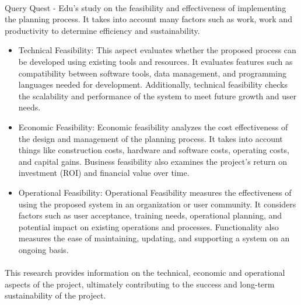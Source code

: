 \paragraph{}Query Quest - Edu's study on the feasibility and effectiveness of implementing the planning process. It takes into account many factors such as work, work and productivity to determine efficiency and sustainability.

\begin{itemize}
    

\item Technical Feasibility: This aspect evaluates whether the proposed process can be developed using existing tools and resources. It evaluates features such as compatibility between software tools, data management, and programming languages needed for development. Additionally, technical feasibility checks the scalability and performance of the system to meet future growth and user needs.

\item Economic Feasibility: Economic feasibility analyzes the cost effectiveness of the design and management of the planning process. It takes into account things like construction costs, hardware and software costs, operating costs, and capital gains. Business feasibility also examines the project's return on investment (ROI) and financial value over time.

\item Operational Feasibility: Operational Feasibility measures the effectiveness of using the proposed system in an organization or user community. It considers factors such as user acceptance, training needs, operational planning, and potential impact on existing operations and processes. Functionality also measures the ease of maintaining, updating, and supporting a system on an ongoing basis.
\end{itemize}

\paragraph{}This research provides information on the technical, economic and operational aspects of the project, ultimately contributing to the success and long-term sustainability of the project.


\newpage


















